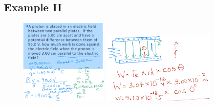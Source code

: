 \documentclass[a4paper,12pt]{article}
\begin{document}
\subsection{Example II}
\begin{figure}[H]
    \centering
    \includegraphics[width=0.39\textwidth]{workplate1}
    \includegraphics[width=0.5\textwidth]{workplate2}
\end{figure}
\end{document}
